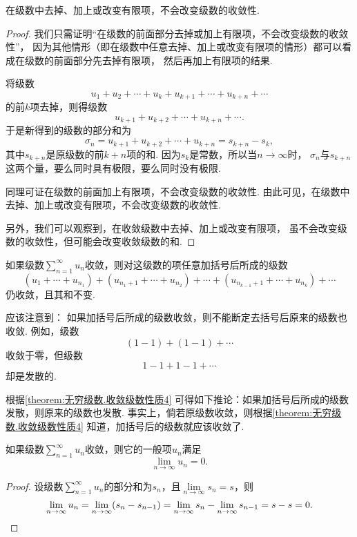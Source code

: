 \begin{property}\label{theorem:无穷级数.收敛级数性质3}
在级数中去掉、加上或改变有限项，不会改变级数的收敛性.
\begin{proof}
我们只需证明“在级数的前面部分去掉或加上有限项，不会改变级数的收敛性”，
因为其他情形（即在级数中任意去掉、加上或改变有限项的情形）都可以看成在级数的前面部分先去掉有限项，
然后再加上有限项的结果.

将级数\[
u_1+u_2+\dotsb+u_k+u_{k+1}+\dotsb+u_{k+n}+\dotsb
\]的前\(k\)项去掉，则得级数\[
u_{k+1}+u_{k+2}+\dotsb+u_{k+n}+\dotsb.
\]于是新得到的级数的部分和为\[
\sigma_n = u_{k+1}+u_{k+2}+\dotsb+u_{k+n} = s_{k+n} - s_k,
\]其中\(s_{k+n}\)是原级数的前\(k+n\)项的和.
因为\(s_k\)是常数，所以当\(n\to\infty\)时，
\(\sigma_n\)与\(s_{k+n}\)这两个量，要么同时具有极限，要么同时没有极限.

同理可证在级数的前面加上有限项，不会改变级数的收敛性.
由此可见，在级数中去掉、加上或改变有限项，不会改变级数的收敛性.

另外，我们可以观察到，在收敛级数中去掉、加上或改变有限项，
虽不会改变级数的收敛性，但可能会改变收敛级数的和.
\end{proof}
\end{property}

\begin{property}\label{theorem:无穷级数.收敛级数性质4}
如果级数\(\sum\limits_{n=1}^\infty u_n\)收敛，则对这级数的项任意加括号后所成的级数\[
(u_1+\dotsb+u_{n_1}) + (u_{n_1+1}+\dotsb+u_{n_2}) + \dotsb + (u_{n_{k-1}+1}+\dotsb+u_{n_k}) + \dotsb
\]仍收敛，且其和不变.
\end{property}

应该注意到：
如果加括号后所成的级数收敛，则不能断定去括号后原来的级数也收敛.
例如，级数\[
(1-1)+(1-1)+\dotsb
\]收敛于零，但级数\[
1-1+1-1+\dotsb
\]却是发散的.

根据\cref{theorem:无穷级数.收敛级数性质4} 可得如下推论：{\color{red}如果加括号后所成的级数发散，则原来的级数也发散.}
事实上，倘若原级数收敛，则根据\cref{theorem:无穷级数.收敛级数性质4} 知道，加括号后的级数就应该收敛了.

\begin{property}[级数收敛的必要条件]\label{theorem:无穷级数.收敛级数性质5}
如果级数\(\sum\limits_{n=1}^\infty u_n\)收敛，则它的一般项\(u_n\)满足\[
\lim\limits_{n\to\infty} u_n = 0.
\]
\begin{proof}
设级数\(\sum\limits_{n=1}^\infty u_n\)的部分和为\(s_n\)，且\(\lim\limits_{n\to\infty} s_n = s\)，则\[
\lim\limits_{n\to\infty} u_n = \lim\limits_{n\to\infty}(s_n - s_{n-1}) = \lim\limits_{n\to\infty} s_n - \lim\limits_{n\to\infty} s_{n-1} = s - s = 0.
\qedhere
\]
\end{proof}
\end{property}

